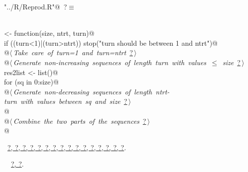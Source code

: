 \documentclass[reqno]{amsart}
\renewcommand{\NWtarget}[2]{\hypertarget{#1}{#2}}
\renewcommand{\NWlink}[2]{\hyperlink{#1}{#2}}
\begin{document}
\begin{flushleft} \small\label{scrap16}\raggedright\small
\NWtarget{nuweb?}{} \verb@"../R/Reprod.R"@\nobreak\ {\footnotesize {?}}$\equiv$
\vspace{-1ex}
\begin{list}{}{} \item
\mbox{}\verb@@\\
\mbox{}\verb@DownUpMatrix <- function(size, ntrt, turn){@\\
\mbox{}\verb@  if ((turn<1)|(turn>ntrt)) stop("turn should be between 1 and ntrt")@\\
\mbox{}\verb@  @\hbox{$\langle\,${\itshape Take care of turn=1 and turn=ntrt}\nobreak\ {\footnotesize \NWlink{nuweb?}{?}}$\,\rangle$}\verb@@\\
\mbox{}\verb@  @\hbox{$\langle\,${\itshape Generate non-increasing sequences of length turn with values $\leq$ size}\nobreak\ {\footnotesize \NWlink{nuweb?}{?}}$\,\rangle$}\verb@@\\
\mbox{}\verb@  res2list <- list()@\\
\mbox{}\verb@  for (sq in 0:size){@\\
\mbox{}\verb@    @\hbox{$\langle\,${\itshape Generate non-decreasing sequences of length ntrt-turn with values between sq and size}\nobreak\ {\footnotesize \NWlink{nuweb?}{?}}$\,\rangle$}\verb@@\\
\mbox{}\verb@  }@\\
\mbox{}\verb@  @\hbox{$\langle\,${\itshape Combine the two parts of the sequences}\nobreak\ {\footnotesize \NWlink{nuweb?}{?}}$\,\rangle$}\verb@@\\
\mbox{}\verb@}@\\
\mbox{}\verb@@{\NWsep}
\end{list}
\vspace{-1.5ex}
\footnotesize
\begin{list}{}{\setlength{\itemsep}{-\parsep}\setlength{\itemindent}{-\leftmargin}}
\item \NWtxtFileDefBy\ \NWlink{nuweb?}{?}\NWlink{nuweb?}{, ?}\NWlink{nuweb?}{, ?}\NWlink{nuweb?}{, ?}\NWlink{nuweb?}{, ?}\NWlink{nuweb?}{, ?}\NWlink{nuweb?}{, ?}\NWlink{nuweb?}{, ?}\NWlink{nuweb?}{, ?}\NWlink{nuweb?}{, ?}\NWlink{nuweb?}{, ?}\NWlink{nuweb?}{, ?}\NWlink{nuweb?}{, ?}\NWlink{nuweb?}{, ?}\NWlink{nuweb?}{, ?}\NWlink{nuweb?}{, ?}.
\item \NWtxtIdentsDefed\nobreak\  \verb@DownUpMatrix@\nobreak\ \NWlink{nuweb?}{?}\NWlink{nuweb?}{, ?}.
\item{}
\end{list}
\vspace{4ex}
\end{flushleft}
\end{document}

